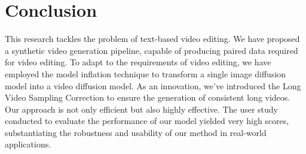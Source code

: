 \section{Conclusion}
\label{sec:conclusion}

This research tackles the problem of text-based video editing. We have proposed a synthetic video generation pipeline, capable of producing paired data required for video editing. To adapt to the requirements of video editing, we have employed the model inflation technique to transform a single image diffusion model into a video diffusion model. As an innovation, we've introduced the Long Video Sampling Correction to ensure the generation of consistent long videos. Our approach is not only efficient but also highly effective. The user study conducted to evaluate the performance of our model yielded very high scores, substantiating the robustness and usability of our method in real-world applications.
